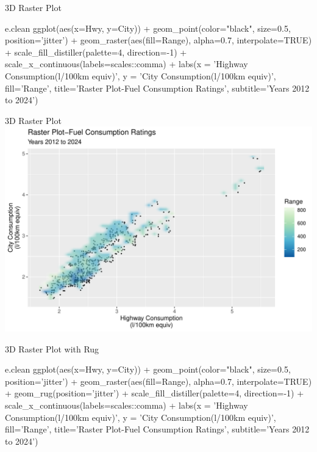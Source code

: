 \documentclass[ignorenonframetext,xcolor=x11names]{beamer}
\begin{document}
\begin{frame}[fragile]{3D Raster Plot}
\footnotesize
\begin{Rcode}
e.clean %
  ggplot(aes(x=Hwy, y=City)) + 
    geom_point(color="black", size=0.5, 
               position='jitter') +
    geom_raster(aes(fill=Range), alpha=0.7, 
                interpolate=TRUE) + 
    scale_fill_distiller(palette=4, direction=-1) +
    scale_x_continuous(labels=scales::comma) +
    labs(x = 'Highway Consumption\n(l/100km equiv)', 
         y = 'City Consumption\n(l/100km equiv)', 
         fill='Range', 
         title='Raster Plot-Fuel Consumption Ratings', 
         subtitle='Years 2012 to 2024') 
\end{Rcode}
\end{frame}

\begin{frame}{3D Raster Plot}
  \includegraphics[width=\textwidth]{fuel.raster.pdf}
\end{frame}

\begin{frame}[fragile]{3D Raster Plot with Rug}
\footnotesize
\begin{Rcode}
e.clean %
  ggplot(aes(x=Hwy, y=City)) + 
    geom_point(color="black", size=0.5, 
               position='jitter') +
    geom_raster(aes(fill=Range), alpha=0.7, 
                interpolate=TRUE) + 
    geom_rug(position='jitter') + 
    scale_fill_distiller(palette=4, direction=-1) +
    scale_x_continuous(labels=scales::comma) +
    labs(x = 'Highway Consumption\n(l/100km equiv)', 
         y = 'City Consumption\n(l/100km equiv)', 
         fill='Range', 
         title='Raster Plot-Fuel Consumption Ratings', 
         subtitle='Years 2012 to 2024') 
\end{Rcode}
\end{frame}
\end{document}
